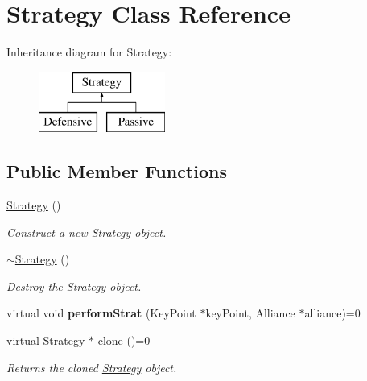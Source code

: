 \hypertarget{classStrategy}{}\section{Strategy Class Reference}
\label{classStrategy}
Inheritance diagram for Strategy\+:\begin{figure}[H]
\begin{center}
\leavevmode
\includegraphics[height=2.000000cm]{classStrategy}
\end{center}
\end{figure}
\subsection*{Public Member Functions}
\begin{DoxyCompactItemize}
\item 
\mbox{\label{classStrategy_a2021a15bbc4f0d13f7b92f8933db2235}} 
\hyperlink{classStrategy_a2021a15bbc4f0d13f7b92f8933db2235}{Strategy} ()
\begin{DoxyCompactList}\small\item\em Construct a new \hyperlink{classStrategy}{Strategy} object. \end{DoxyCompactList}\item 
\mbox{\label{classStrategy_a37c0bbdd64fd7dfcdd91578784a64775}} 
\hyperlink{classStrategy_a37c0bbdd64fd7dfcdd91578784a64775}{$\sim$\+Strategy} ()
\begin{DoxyCompactList}\small\item\em Destroy the \hyperlink{classStrategy}{Strategy} object. \end{DoxyCompactList}\item 
\mbox{\label{classStrategy_aa0692005cb67d0ee2441046f6b302e7d}} 
virtual void {\bfseries perform\+Strat} (Key\+Point $\ast$key\+Point, Alliance $\ast$alliance)=0
\item 
virtual \hyperlink{classStrategy}{Strategy} $\ast$ \hyperlink{classStrategy_aaed20ba057db079ae2bc41b19b009211}{clone} ()=0
\begin{DoxyCompactList}\small\item\em Returns the cloned \hyperlink{classStrategy}{Strategy} object. \end{DoxyCompactList}\end{DoxyCompactItemize}
